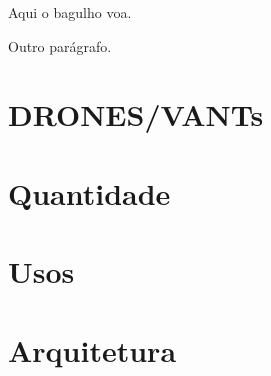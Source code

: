
Aqui o bagulho voa.

Outro parágrafo.

\section{DRONES/VANTs}
\section{Quantidade}
\section{Usos}
\section{Arquitetura}

